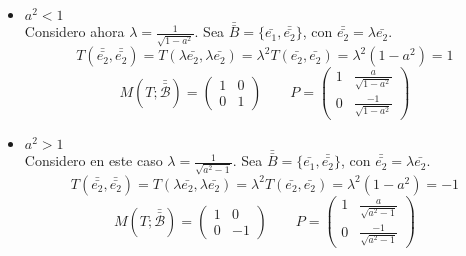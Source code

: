 \begin{ejercicio}
\begin{itemize}
\begin{itemize}
            \begin{itemize}
                \item $a^2 < 1$\\
                Considero ahora $\lambda = \frac{1}{\sqrt{1-a^2}}$. Sea $\bar{\bar{B}} = \{\bar{e_1}, \bar{\bar{e_2}}\}$, con $\bar{\bar{e_2}} = \lambda \bar{e_2}$.
                \begin{equation*}
                    T(\bar{\bar{e_2}}, \bar{\bar{e_2}}) = T(\lambda \bar{e_2}, \lambda \bar{e_2}) = \lambda^2 T(\bar{e_2}, \bar{e_2}) = \lambda^2 (1-a^2) = 1
                \end{equation*}
                \begin{equation*}
                    M(T;\bar{\bar{\mathcal{B}}}) = \left( \begin{array}{cc}
                        1 & 0 \\
                        0 & 1
                    \end{array} \right) \qquad
                    P = \left( \begin{array}{cc}
                        1 & \frac{a}{\sqrt{1-a^2}} \\
                        0 & \frac{-1}{\sqrt{1-a^2}}
                    \end{array} \right)
                \end{equation*}

                \item $a^2 > 1$\\
                Considero en este caso $\lambda = \frac{1}{\sqrt{a^2-1}}$. Sea $\bar{\bar{B}} = \{\bar{e_1}, \bar{\bar{e_2}}\}$, con $\bar{\bar{e_2}} = \lambda \bar{e_2}$.
                \begin{equation*}
                    T(\bar{\bar{e_2}}, \bar{\bar{e_2}}) = T(\lambda \bar{e_2}, \lambda \bar{e_2}) = \lambda^2 T(\bar{e_2}, \bar{e_2}) = \lambda^2 (1-a^2) = -1
                \end{equation*}
                \begin{equation*}
                    M(T;\bar{\bar{\mathcal{B}}}) = \left( \begin{array}{cc}
                        1 & 0 \\
                        0 & -1
                    \end{array} \right) \qquad
                    P = \left( \begin{array}{cc}
                        1 & \frac{a}{\sqrt{a^2-1}} \\
                        0 & \frac{-1}{\sqrt{a^2-1}}
                    \end{array} \right)
                \end{equation*}
            \end{itemize}


\end{itemize}
\end{itemize}
\end{ejercicio}
